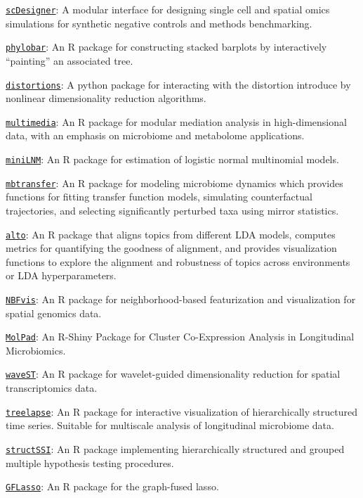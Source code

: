 \documentclass[letterpaper]{article}
\renewenvironment{itemize}{
  \begin{list}{}{
    \setlength{\leftmargin}{1.5em}
  }
}{
  \end{list}
}
\begin{document}
\begin{itemize}
\item \href{https://github.com/krisrs1128/scDesigner}{\texttt{scDesigner}}:
A modular interface for designing single cell and spatial omics simulations for
synthetic negative controls and methods benchmarking.
\item \href{https://mkdiro-o.github.io/phylobar/}{\texttt{phylobar}}: An R
package for constructing stacked barplots by interactively ``painting'' an
associated tree.
\item \href{https://krisrs1128.github.io/distortions/site/}{\texttt{distortions}}: A
python package for interacting with the distortion introduce by nonlinear
dimensionality reduction algorithms.
\item \href{https://krisrs1128.github.io/multimedia/}{\texttt{multimedia}}: An R
package for modular mediation analysis in high-dimensional data, with an
emphasis on microbiome and metabolome applications.
\item \href{https://cran.r-project.org/web/packages/miniLNM/index.html}{\texttt{miniLNM}}:
An R package for estimation of logistic normal multinomial models.
\item \href{https://krisrs1128.github.io/mbtransfer/}{\texttt{mbtransfer}}: An R
package for modeling microbiome dynamics which provides functions for fitting
transfer function models, simulating counterfactual trajectories, and selecting
significantly perturbed taxa using mirror statistics.
\item \href{https://lasy.github.io/alto/}{\texttt{alto}}: An R package that
aligns topics from different LDA models, computes metrics for quantifying the
goodness of alignment, and provides visualization functions to explore the
alignment and robustness of topics across environments or LDA hyperparameters.
\item \href{https://github.com/XTH1114/NBFvis}{\texttt{NBFvis}}: An R package
for neighborhood-based featurization and visualization for spatial genomics
data.
\item \href{https://kaiyanm.github.io/MolPad/}{\texttt{MolPad}}: An R-Shiny
Package for Cluster Co-Expression Analysis in Longitudinal Microbiomics.
\item \href{https://github.com/OliverXUZY/waveST/}{\texttt{waveST}}: An R
package for wavelet-guided dimensionality reduction for spatial transcriptomics
data.
\item \href{https://krisrs1128.github.io/treelapse/}{\texttt{treelapse}}: An R
package for interactive visualization of hierarchically structured time series.
Suitable for multiscale analysis of longitudinal microbiome data.
\item \href{https://cran.r-project.org/web/packages/structSSI/}{\texttt{structSSI}}: An R
package implementing hierarchically structured and grouped multiple hypothesis
testing procedures.
\item \href{https://github.com/krisrs1128/GFLasso}{\texttt{GFLasso}}: An R
package for the graph-fused lasso.
\end{itemize}
\end{document}
